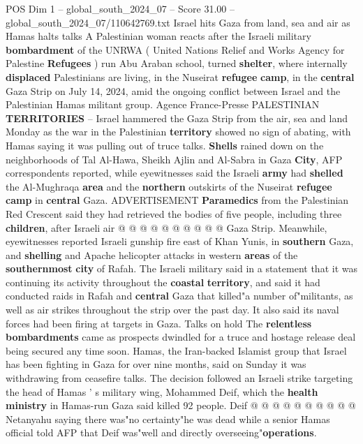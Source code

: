 \begin{textsample}{POS Dim 1 – global\_south\_2024\_07 – Score 31.00 – global\_south\_2024\_07/110642769.txt}  \label{ex:f1_pos_175}
Israel hits Gaza from land, sea and air as Hamas halts talks A Palestinian woman reacts after the Israeli military \textbf{bombardment} of the UNRWA ( United Nations Relief and Works Agency for Palestine \textbf{Refugees} ) run Abu Araban school, turned \textbf{shelter}, where internally \textbf{displaced} Palestinians are living, in the Nuseirat \textbf{refugee} \textbf{camp}, in the \textbf{central} Gaza Strip on July 14, 2024, amid the ongoing conflict between Israel and the Palestinian Hamas militant group.
Agence France-Presse PALESTINIAN \textbf{TERRITORIES} -- Israel hammered the Gaza Strip from the air, sea and land Monday as the war in the Palestinian \textbf{territory} showed no sign of abating, with Hamas saying it was pulling out of truce talks. \textbf{Shells} rained down on the neighborhoods of Tal Al-Hawa, Sheikh Ajlin and Al-Sabra in Gaza \textbf{City}, AFP correspondents reported, while eyewitnesses said the Israeli \textbf{army} had \textbf{shelled} the Al-Mughraqa \textbf{area} and the \textbf{northern} outskirts of the Nuseirat \textbf{refugee} \textbf{camp} in \textbf{central} Gaza.
ADVERTISEMENT \textbf{Paramedics} from the Palestinian Red Crescent said they had retrieved the bodies of five people, including three \textbf{children}, after Israeli air @ @ @ @ @ @ @ @ @ @ Gaza Strip.
Meanwhile, eyewitnesses reported Israeli gunship fire east of Khan Yunis, in \textbf{southern} Gaza, and \textbf{shelling} and Apache helicopter attacks in western \textbf{areas} of the \textbf{southernmost} \textbf{city} of Rafah.
The Israeli military said in a statement that it was continuing its activity throughout the \textbf{coastal} \textbf{territory}, and said it had conducted raids in Rafah and \textbf{central} Gaza that killed"a number of"militants, as well as air strikes throughout the strip over the past day.
It also said its naval forces had been firing at targets in Gaza.
Talks on hold The \textbf{relentless} \textbf{bombardments} came as prospects dwindled for a truce and hostage release deal being secured any time soon.
Hamas, the Iran-backed Islamist group that Israel has been fighting in Gaza for over nine months, said on Sunday it was withdrawing from ceasefire talks.
The decision followed an Israeli strike targeting the head of Hamas ' s military wing, Mohammed Deif, which the \textbf{health} \textbf{ministry} in Hamas-run Gaza said killed 92 people.
Deif @ @ @ @ @ @ @ @ @ @ Netanyahu saying there was"no certainty"he was dead while a senior Hamas official told AFP that Deif was"well and directly overseeing"\textbf{operations}.

\end{textsample}
